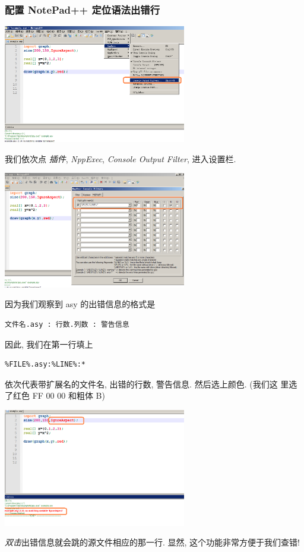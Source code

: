 \documentclass[nofonts,CJKnormalspaces]{ctexbook}[2009/05/20]
\begin{document}
\subsubsection{配置 NotePad++ 定位语法出错行}
\begin{center}
  \includegraphics[width=0.6\textwidth]{NotePad++a.png}
\end{center}
我们依次点 \emph{插件}, \emph{NppExec}, \emph{Console Output Filter},
进入设置栏.
\begin{center}
  \includegraphics[width=0.6\textwidth]{NotePad++b.png}
\end{center}
因为我们观察到 asy 的出错信息的格式是
\begin{verbatim}
文件名.asy : 行数.列数 : 警告信息
\end{verbatim}
因此, 我们在第一行填上
\begin{verbatim}
%FILE%.asy:%LINE%:*
\end{verbatim}
依次代表带扩展名的文件名, 出错的行数, 警告信息. 然后选上颜色. (我们这
里选了红色 FF 00 00  和粗体 B)
\begin{center}
  \includegraphics[width=0.6\textwidth]{NotePad++c.png}
\end{center}
\emph{双击}出错信息就会跳的源文件相应的那一行. 显然, 这个功能非常方便于我们查错!
\end{document}
